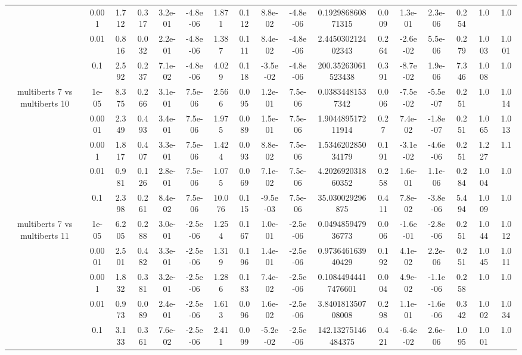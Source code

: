 \begin{tabular}{|c|c|c|c|c|c|c|c|c|c|c|c|c|c|c|c|c|}
 & 0.001 & 1.712 & 0.317 & 3.2e-01 & -4.8e-06 & 1.871 & 0.112 & 8.8e-02 & -4.8e-06 & 0.192986860871315 & 0.009 & 1.3e-01 & 2.3e-06 & 0.254 & 1.0 & 1.0 \\
 & 0.01 & 0.816 & 0.032 & 2.2e-01 & -4.8e-06 & 1.387 & 0.111 & 8.4e-02 & -4.8e-06 & 2.445030212402343 & 0.264 & -2.6e-02 & 5.5e-06 & 0.279 & 1.003 & 1.001 \\
 & 0.1 & 2.592 & 0.237 & 7.1e-02 & -4.8e-06 & 4.029 & 0.118 & -3.5e-02 & -4.8e-06 & 200.35263061523438 & 0.391 & -8.7e-02 & 1.9e-06 & 7.346 & 1.008 & 1.0 \\
\hline
\multirow{5}{*}{multiberts 7 vs multiberts 10} & 1e-05 & 8.375 & 0.266 & 3.1e-01 & 7.5e-06 & 2.566 & 0.095 & 1.2e-01 & 7.5e-06 & 0.03834481537342 & 0.006 & -7.5e-02 & -5.5e-07 & 0.251 & 1.0 & 1.014 \\
 & 0.0001 & 2.349 & 0.493 & 3.4e-01 & 7.5e-06 & 1.975 & 0.089 & 1.5e-01 & 7.5e-06 & 1.904489517211914 & 0.27 & 7.4e-02 & -1.8e-07 & 0.251 & 1.065 & 1.013 \\
 & 0.001 & 1.817 & 0.407 & 3.3e-01 & 7.5e-06 & 1.424 & 0.093 & 8.8e-02 & 7.5e-06 & 1.534620285034179 & 0.191 & -3.1e-02 & -4.6e-06 & 0.251 & 1.227 & 1.1 \\
 & 0.01 & 0.981 & 0.126 & 2.8e-01 & 7.5e-06 & 1.075 & 0.069 & 7.1e-02 & 7.5e-06 & 4.202692031860352 & 0.258 & 1.6e-01 & 1.1e-06 & 0.284 & 1.004 & 1.0 \\
 & 0.1 & 2.398 & 0.261 & 8.4e-02 & 7.5e-06 & 10.076 & 0.115 & -9.5e-03 & 7.5e-06 & 35.030029296875 & 0.411 & 7.8e-02 & -3.8e-06 & 5.494 & 1.009 & 1.0 \\
\hline
\multirow{5}{*}{multiberts 7 vs multiberts 11} & 1e-05 & 6.205 & 0.288 & 3.0e-01 & -2.5e-06 & 1.254 & 0.167 & 1.0e-01 & -2.5e-06 & 0.049485947936773 & 0.006 & -1.6e-01 & -2.8e-06 & 0.251 & 1.044 & 1.012 \\
 & 0.0001 & 2.501 & 0.482 & 3.3e-01 & -2.5e-06 & 1.319 & 0.196 & 1.4e-01 & -2.5e-06 & 0.973646163940429 & 0.192 & 4.1e-02 & 2.2e-06 & 0.251 & 1.045 & 1.011 \\
 & 0.001 & 1.832 & 0.381 & 3.2e-01 & -2.5e-06 & 1.286 & 0.183 & 7.4e-02 & -2.5e-06 & 0.10844944417476601 & 0.004 & 4.9e-02 & -1.1e-06 & 0.258 & 1.0 & 1.0 \\
 & 0.01 & 0.973 & 0.089 & 2.4e-01 & -2.5e-06 & 1.613 & 0.096 & 1.6e-02 & -2.5e-06 & 3.840181350708008 & 0.298 & 1.1e-01 & -1.6e-06 & 0.342 & 1.002 & 1.034 \\
 & 0.1 & 3.133 & 0.361 & 7.6e-02 & -2.5e-06 & 2.411 & 0.099 & -5.2e-02 & -2.5e-06 & 142.13275146484375 & 0.421 & -6.4e-02 & 2.6e-06 & 1.095 & 1.001 & 1.0 \\

\end{tabular}
